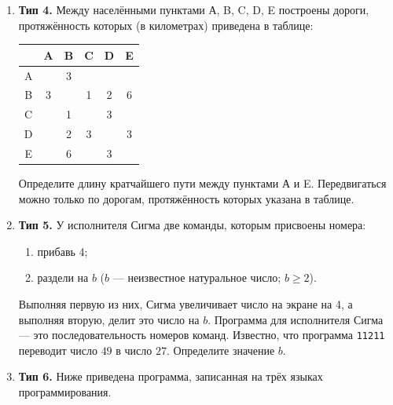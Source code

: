 \documentclass[a4paper]{article}
\begin{document}
\begin{enumerate}[label=\textbf{Задача \arabic*.}, leftmargin=*, itemsep=10mm]
\begin{center}
НЕ ($x$ чётное) \quad И \quad НЕ ($x$ кратно 13).
\end{center}

\item \textbf{Тип 4.}
Между населёнными пунктами А, B, C, D, E построены дороги,
протяжённость которых (в километрах) приведена в таблице:

\bigskip
\begin{center}
\begin{tabular}{c|ccccc}
  & A & B & C & D & E \\
\hline
A &   & 3 &   &   &   \\
B & 3 &   & 1 & 2 & 6 \\
C &   & 1 &   & 3 &   \\
D &   & 2 & 3 &   & 3 \\
E &   & 6 &   & 3 &   \\
\end{tabular}
\end{center}
\bigskip

Определите длину кратчайшего пути между пунктами А и E.
Передвигаться можно только по дорогам, протяжённость которых
указана в таблице.

\item \textbf{Тип 5.}
У исполнителя Сигма две команды, которым присвоены номера:
\begin{enumerate}[label=\arabic*.]
  \item прибавь 4;
  \item раздели на $b$ \quad ($b$ — неизвестное натуральное число; $b \geq 2$).
\end{enumerate}
Выполняя первую из них, Сигма увеличивает число на экране на 4, а выполняя
вторую, делит это число на $b$. Программа для исполнителя Сигма — это
последовательность номеров команд. Известно, что программа \texttt{11211}
переводит число $49$ в число $27$. Определите значение $b$.

\item \textbf{Тип 6.}
Ниже приведена программа, записанная на трёх языках программирования.


\end{enumerate}
\end{document}
